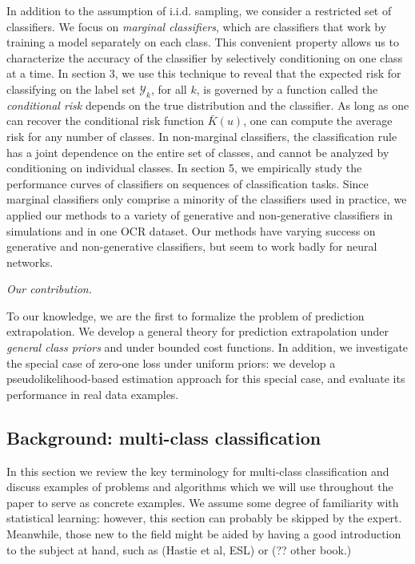 \documentclass[12pt]{article}
\begin{document}
In addition to the assumption of i.i.d. sampling, we consider a
restricted set of classifiers.  We focus on \emph{marginal
classifiers}, which are classifiers that work by training a model
separately on each class.  This convenient property allows us to
characterize the accuracy of the classifier by selectively
conditioning on one class at a time.  In section 3, we use this
technique to reveal that the expected risk for classifying on the
label set $\mathcal{Y}_k$, for all $k$, is governed by a function
called the \emph{conditional risk} depends on the true distribution
and the classifier.  As long as one can recover the conditional risk
function $\bar{K}(u)$, one can compute the average risk for any number
of classes.  In non-marginal classifiers, the classification rule has
a joint dependence on the entire set of classes, and cannot be
analyzed by conditioning on individual classes.  In section 5, we
empirically study the performance curves of classifiers on sequences
of classification tasks.  Since marginal classifiers only comprise a
minority of the classifiers used in practice, we applied our methods
to a variety of generative and non-generative classifiers in
simulations and in one OCR dataset.  Our methods have varying success
on generative and non-generative classifiers, but seem to work badly
for neural networks.
\newline

\noindent\emph{Our contribution.}

To our knowledge, we are the first to formalize the problem of
prediction extrapolation.  We develop a general theory for prediction
extrapolation under \emph{general class priors} and under bounded cost
functions.  In addition, we investigate the special case of zero-one
loss under uniform priors: we develop a pseudolikelihood-based
estimation approach for this special case, and evaluate its
performance in real data examples.

\subsection{Background: multi-class classification}

In this section we review the key terminology for multi-class
classification and discuss examples of problems and algorithms which
we will use throughout the paper to serve as concrete examples.  We
assume some degree of familiarity with statistical learning: however,
this section can probably be skipped by the expert.  Meanwhile, those
new to the field might be aided by having a good introduction to the
subject at hand, such as (Hastie et al, ESL) or (?? other book.)
\end{document}
